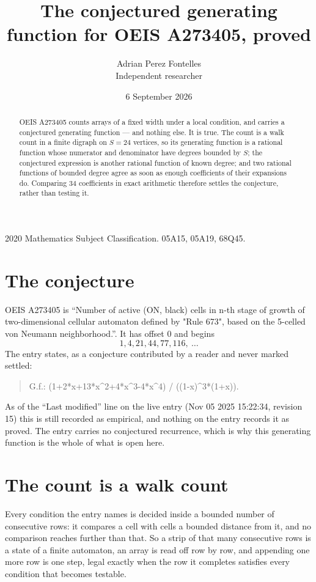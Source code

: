 \documentclass[11pt,a4paper]{article}
\title{The conjectured generating function for OEIS A273405, proved}
\author{Adrian Perez Fontelles\\ \small Independent researcher}
\date{6 September 2026}
\theoremstyle{plain}
\theoremstyle{definition}
\begin{document}
\maketitle

\begin{abstract}
OEIS A273405 counts arrays of a fixed width under a local condition, and carries a conjectured
generating function --- and nothing else. It is true. The count is a walk count in a finite
digraph on $S=24$ vertices, so its generating function is a rational function whose numerator
and denominator have degrees bounded by $S$; the conjectured expression is another rational
function of known degree; and two rational functions of bounded degree agree as soon as enough
coefficients of their expansions do. Comparing $34$ coefficients in exact arithmetic
therefore settles the conjecture, rather than testing it.
\end{abstract}

\noindent\small 2020 Mathematics Subject Classification. 05A15, 05A19, 68Q45.\normalsize

\section{The conjecture}

OEIS A273405 is ``Number of active (ON, black) cells in n-th stage of growth of two-dimensional cellular automaton defined by "Rule 673", based on the 5-celled von Neumann neighborhood.''. It has offset $0$ and begins
\[
1, 4, 21, 44, 77, 116,\ \dots
\]
The entry states, as a conjecture contributed by a reader and never marked settled:
\begin{quote}
G.f.: (1+2*x+13*x\^{}2+4*x\^{}3-4*x\^{}4) / ((1-x)\^{}3*(1+x)).
\end{quote}
As of the ``Last modified'' line on the live entry (Nov 05 2025 15:22:34, revision 15) this is still
recorded as empirical, and nothing on the entry records it as proved. The entry carries no
conjectured recurrence, which is why this generating function is the whole of what is open
here.

\section{The count is a walk count}

Every condition the entry names is decided inside a bounded number of consecutive rows: it
compares a cell with cells a bounded distance from it, and no comparison reaches further than
that. So a strip of that many consecutive rows is a state of a finite automaton, an array is
read off row by row, and appending one more row is one step, legal exactly when the row it
completes satisfies every condition that becomes testable.
\end{document}
